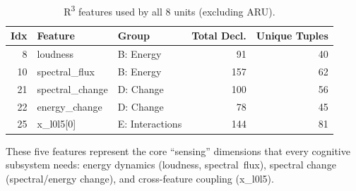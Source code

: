 \begin{table}[H]
\centering
\caption{R\textsuperscript{3} features used by all 8 units (excluding ARU).}
\label{tab:universal-features}
\renewcommand{\arraystretch}{1.15}
\begin{tabular}{@{}rllrr@{}}
\toprule
\textbf{Idx} & \textbf{Feature} & \textbf{Group}
  & \textbf{Total Decl.} & \textbf{Unique Tuples} \\
\midrule
\rowcolor{grpB}
 8 & loudness        & B: Energy      &  91 & 40 \\
\rowcolor{grpB}
10 & spectral\_flux  & B: Energy      & 157 & 62 \\
\rowcolor{grpD}
21 & spectral\_change & D: Change     & 100 & 56 \\
\rowcolor{grpD}
22 & energy\_change   & D: Change     &  78 & 45 \\
\rowcolor{grpE}
25 & x\_l0l5[0]       & E: Interactions & 144 & 81 \\
\bottomrule
\end{tabular}
\end{table}

\noindent
These five features represent the core ``sensing'' dimensions
that every cognitive subsystem needs:
energy dynamics (loudness, spectral~flux),
spectral change (spectral/energy change),
and cross-feature coupling (x\_l0l5).

